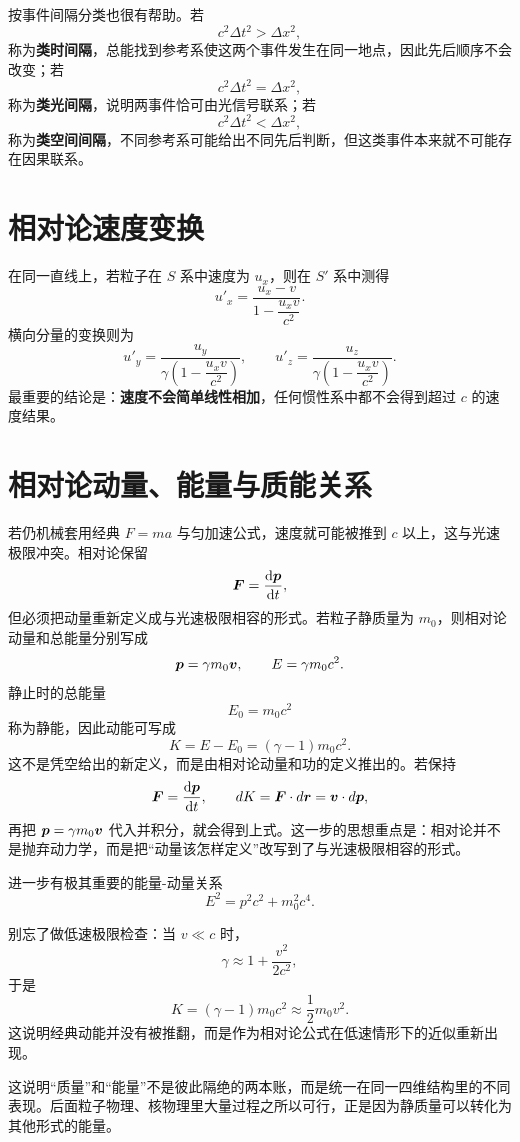 \documentclass[lang=cn,11pt]{elegantbook}
\newcommand{\bridge}[1]{\begin{note}#1\end{note}}
\begin{document}
\begin{note}
按事件间隔分类也很有帮助。若
\[
c^2\Delta t^2>\Delta x^2,
\]
称为\textbf{类时间隔}，总能找到参考系使这两个事件发生在同一地点，因此先后顺序不会改变；若
\[
c^2\Delta t^2=\Delta x^2,
\]
称为\textbf{类光间隔}，说明两事件恰可由光信号联系；若
\[
c^2\Delta t^2<\Delta x^2,
\]
称为\textbf{类空间间隔}，不同参考系可能给出不同先后判断，但这类事件本来就不可能存在因果联系。
\end{note}

\section{相对论速度变换}

在同一直线上，若粒子在 \(S\) 系中速度为 \(u_x\)，则在 \(S'\) 系中测得
\[
u'_x=\frac{u_x-v}{1-\dfrac{u_xv}{c^2}}.
\]
横向分量的变换则为
\[
u'_y=\frac{u_y}{\gamma\left(1-\dfrac{u_xv}{c^2}\right)},
\qquad
u'_z=\frac{u_z}{\gamma\left(1-\dfrac{u_xv}{c^2}\right)}.
\]
最重要的结论是：\textbf{速度不会简单线性相加}，任何惯性系中都不会得到超过 \(c\) 的速度结果。

\section{相对论动量、能量与质能关系}

若仍机械套用经典 \(F=ma\) 与匀加速公式，速度就可能被推到 \(c\) 以上，这与光速极限冲突。相对论保留
\[
\vb*{F}=\dv{\vb*{p}}{t},
\]
但必须把动量重新定义成与光速极限相容的形式。若粒子静质量为 \(m_0\)，则相对论动量和总能量分别写成
\[
\vb*{p}=\gamma m_0 \vb*{v},
\qquad
E=\gamma m_0 c^2.
\]
静止时的总能量
\[
E_0=m_0c^2
\]
称为静能，因此动能可写成
\[
K=E-E_0=(\gamma-1)m_0c^2.
\]
这不是凭空给出的新定义，而是由相对论动量和功的定义推出的。若保持
\[
\vb*{F}=\dv{\vb*{p}}{t},
\qquad
dK=\vb*{F}\cdot d\vb*{r}=\vb*{v}\cdot d\vb*{p},
\]
再把 \(\vb*{p}=\gamma m_0\vb*{v}\) 代入并积分，就会得到上式。这一步的思想重点是：相对论并不是抛弃动力学，而是把“动量该怎样定义”改写到了与光速极限相容的形式。

进一步有极其重要的能量-动量关系
\[
E^2=p^2c^2+m_0^2c^4.
\]

\begin{remark}
别忘了做低速极限检查：当 \(v\ll c\) 时，
\[
\gamma\approx 1+\frac{v^2}{2c^2},
\]
于是
\[
K=(\gamma-1)m_0c^2\approx \frac12 m_0v^2.
\]
这说明经典动能并没有被推翻，而是作为相对论公式在低速情形下的近似重新出现。
\end{remark}

\bridge{这说明“质量”和“能量”不是彼此隔绝的两本账，而是统一在同一四维结构里的不同表现。后面粒子物理、核物理里大量过程之所以可行，正是因为静质量可以转化为其他形式的能量。}
\end{document}
